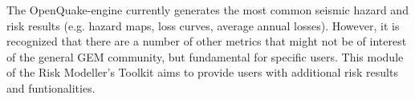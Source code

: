 The OpenQuake-engine currently generates the most common seismic hazard and risk results (e.g. hazard maps, loss curves, average annual losses). However, it is recognized that there are a number of other metrics that might not be of interest of the general GEM community, but fundamental for specific users. This module of the Risk Modeller's Toolkit aims to provide users with additional risk results and funtionalities.